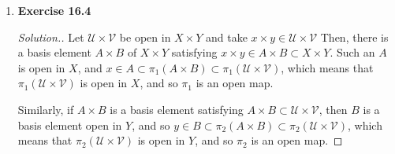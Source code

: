 \documentclass{article}
\newcommand{\T}{\mathcal{T}}
\newcommand{\U}{\mathcal{U}}
\newcommand{\R}{\mathbb{R}}
\newcommand{\B}{\mathcal{B}}
\newcommand{\C}{\mathcal{C}}
\newcommand{\sk}{\smallskip}
\begin{document}
\begin{enumerate}
\begin{proof}[Solution.]
\begin{enumerate}
            \item 
            We are asked to show two things. First, that $\C$ is a basis for $\R$, and second, that the topology generated by $\C$ is different than the lower limit topology. 

            \sk

            First, we show that $\C$ meets the two conditions for being a basis. $\forall x \in \R, x \in \left[\lfloor x \rfloor, \lceil x \rceil\right)$, and this is an element of $\C$. As well, if $x \in [a_1, b_1) \cap [a_2, b_2)$, then let $a = \max(a_1, a_2)$ and $b = \min(b_1, b_2)$. Then $x \in [a, b) \subset [a_1, b_1) \cap [a_2, b_2)$, and $[a, b) \in \C$. These two statements show that $\C$ is a basis. 

            \sk

            Second, we show that the topology generated by $\C$ is not the lower limit topology. A topology $\T$ generated by a basis $\B$ satisfies $\forall \U \in \T$ and $\forall x \in \U, \exists B \in \B$ s.t. $x \in \B \subset \U$. We will provide a set $\U$ and element $x$ for which no element $C$ of $\C$ satisfies $x \in C \in \U$. Take $\U = [x, x + 1)$ where $x$ is irrational. Then since $\C$ is defined such that the lower bound is rational, there is no element $C \in \C$ which contains $x$ and is a subset of $\U$. Thus, the topology generated by $\C$ is different than the lower limit topology. 
        \end{enumerate}
    \end{proof}

    \item 
    \textbf{Exercise 16.4}
    \begin{proof}[Solution.]
        Let $\U \times \mathcal{V}$ be open in $X \times Y$ and take $x \times y \in \U\times\mathcal{V}$ Then, there is a basis element $A \times B$ of $X \times Y$ satisfying $x \times y \in A \times B \subset X \times Y$. Such an $A$ is open in $X$, and $x \in A \subset \pi_1\left(A\times B\right) \subset \pi_1(\U \times \mathcal{V})$, which means that $\pi_1(\U\times\mathcal{V})$ is open in $X$, and so $\pi_1$ is an open map. 

        \sk

        Similarly, if $A \times B$ is a basis element satisfying $A \times B \subset \U \times \mathcal{V}$, then $B$ is a basis element open in $Y$, and so $y \in B \subset \pi_2(A \times B) \subset \pi_2(\U \times \mathcal{V})$, which means that $\pi_2(\U \times \mathcal{V})$ is open in $Y$, and so $\pi_2$ is an open map. 
    \end{proof}


\end{enumerate}
\end{document}
